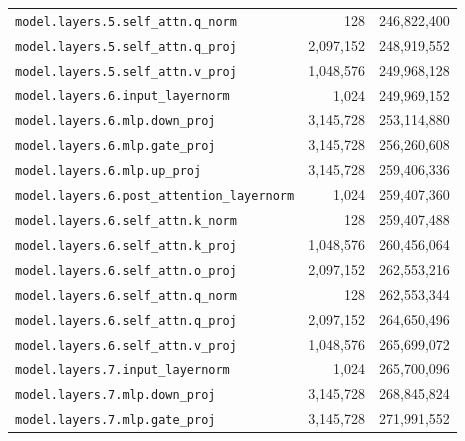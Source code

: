 \documentclass[10pt,a4paper]{article}
\theoremstyle{definition}
\begin{document}
\begin{appendices}
\begin{longtable}{p{9.5cm}rr}
\texttt{model.\allowbreak{}layers.\allowbreak{}5.\allowbreak{}self\_attn.\allowbreak{}q\_norm} & 128 & 246,822,400 \\
\texttt{model.\allowbreak{}layers.\allowbreak{}5.\allowbreak{}self\_attn.\allowbreak{}q\_proj} & 2,097,152 & 248,919,552 \\
\texttt{model.\allowbreak{}layers.\allowbreak{}5.\allowbreak{}self\_attn.\allowbreak{}v\_proj} & 1,048,576 & 249,968,128 \\
\texttt{model.\allowbreak{}layers.\allowbreak{}6.\allowbreak{}input\_layernorm} & 1,024 & 249,969,152 \\
\texttt{model.\allowbreak{}layers.\allowbreak{}6.\allowbreak{}mlp.\allowbreak{}down\_proj} & 3,145,728 & 253,114,880 \\
\texttt{model.\allowbreak{}layers.\allowbreak{}6.\allowbreak{}mlp.\allowbreak{}gate\_proj} & 3,145,728 & 256,260,608 \\
\texttt{model.\allowbreak{}layers.\allowbreak{}6.\allowbreak{}mlp.\allowbreak{}up\_proj} & 3,145,728 & 259,406,336 \\
\texttt{model.\allowbreak{}layers.\allowbreak{}6.\allowbreak{}post\_attention\_layernorm} & 1,024 & 259,407,360 \\
\texttt{model.\allowbreak{}layers.\allowbreak{}6.\allowbreak{}self\_attn.\allowbreak{}k\_norm} & 128 & 259,407,488 \\
\texttt{model.\allowbreak{}layers.\allowbreak{}6.\allowbreak{}self\_attn.\allowbreak{}k\_proj} & 1,048,576 & 260,456,064 \\
\texttt{model.\allowbreak{}layers.\allowbreak{}6.\allowbreak{}self\_attn.\allowbreak{}o\_proj} & 2,097,152 & 262,553,216 \\
\texttt{model.\allowbreak{}layers.\allowbreak{}6.\allowbreak{}self\_attn.\allowbreak{}q\_norm} & 128 & 262,553,344 \\
\texttt{model.\allowbreak{}layers.\allowbreak{}6.\allowbreak{}self\_attn.\allowbreak{}q\_proj} & 2,097,152 & 264,650,496 \\
\texttt{model.\allowbreak{}layers.\allowbreak{}6.\allowbreak{}self\_attn.\allowbreak{}v\_proj} & 1,048,576 & 265,699,072 \\
\texttt{model.\allowbreak{}layers.\allowbreak{}7.\allowbreak{}input\_layernorm} & 1,024 & 265,700,096 \\
\texttt{model.\allowbreak{}layers.\allowbreak{}7.\allowbreak{}mlp.\allowbreak{}down\_proj} & 3,145,728 & 268,845,824 \\
\texttt{model.\allowbreak{}layers.\allowbreak{}7.\allowbreak{}mlp.\allowbreak{}gate\_proj} & 3,145,728 & 271,991,552 \\

\end{longtable}
\end{appendices}
\end{document}
